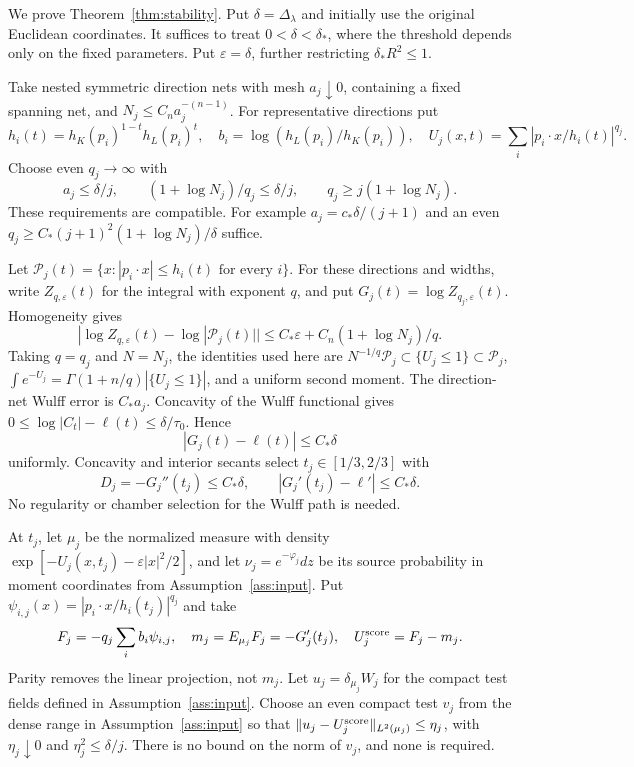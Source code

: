 \documentclass[11pt,reqno]{amsart}
\numberwithin{equation}{section}
\theoremstyle{remark}
\theoremstyle{definition}
\begin{document}
We prove Theorem~\ref{thm:stability}. Put $\delta=\Delta_\lambda$ and initially use the original Euclidean coordinates. It suffices to treat \(0<\delta<\delta_*\), where the threshold depends only on the fixed parameters. Put \(\varepsilon=\delta\), further restricting \(\delta_*R^2\le1\).

Take nested symmetric direction nets with mesh \(a_j\downarrow0\), containing a fixed spanning net, and \(N_j\le C_na_j^{-(n-1)}\). For representative directions put
\[
h_i(t)=h_K(p_i)^{1-t}h_L(p_i)^t,\quad
b_i=\log(h_L(p_i)/h_K(p_i)),\quad
U_j(x,t)=\sum_i|p_i\cdot x/h_i(t)|^{q_j}.
\]
Choose even \(q_j\to\infty\) with
\[
a_j\le\delta/j,\qquad
(1+\log N_j)/q_j\le\delta/j,\qquad
q_j\ge j(1+\log N_j).
                                                                    \tag{3.1}
\]
These requirements are compatible. For example \(a_j=c_*\delta/(j+1)\) and an even \(q_j\ge C_*(j+1)^2(1+\log N_j)/\delta\) suffice. 

Let $\mathcal P_j(t)=\{x:|p_i\cdot x|\le h_i(t)\text{ for every }i\}$.
For these directions and widths, write $Z_{q,\varepsilon}(t)$ for the
integral with exponent $q$, and put
$G_j(t)=\log Z_{q_j,\varepsilon}(t)$.
Homogeneity gives
\[
|\log Z_{q,\varepsilon}(t)-\log|\mathcal P_j(t)||\le
C_*\varepsilon+C_n(1+\log N_j)/q.
\]
Taking $q=q_j$ and $N=N_j$, the identities used here are \(N^{-1/q}\mathcal P_j\subset\{U_j\le1\}\subset\mathcal P_j\),
\(\int e^{-U_j}=\Gamma(1+n/q)|\{U_j\le1\}|\), and a uniform second moment. The direction-net Wulff error is \(C_*a_j\). Concavity of the Wulff functional gives \(0\le\log|C_t|-\ell(t)\le\delta/\tau_0\). Hence
\[
|G_j(t)-\ell(t)|\le C_*\delta
\]
uniformly. Concavity and interior secants select \(t_j\in[1/3,2/3]\) with
\[
D_j=-G_j''(t_j)\le C_*\delta,\qquad
|G_j'(t_j)-\ell'|\le C_*\delta.                       \tag{3.2}
\]
No regularity or chamber selection for the Wulff path is needed.

At $t_j$, let $\mu_j$ be the normalized measure with density
$\exp[-U_j(x,t_j)-\varepsilon|x|^2/2]$, and let
$\nu_j=e^{-\varphi_j}dz$ be its source probability in moment coordinates
from Assumption~\ref{ass:input}. Put
$\psi_{i,j}(x)=|p_i\cdot x/h_i(t_j)|^{q_j}$ and take
\[
F_j=-q_j\sum_i b_i\psi_{i,j},\quad m_j=E_{\mu_j}F_j=-G_j'(t_j),
\quad U_j^{\rm score}=F_j-m_j.
\]
Parity removes the linear projection, not \(m_j\). Let $u_j=\delta_{\mu_j}W_j$ for the compact test fields defined in Assumption~\ref{ass:input}. Choose an even compact test \(v_j\) from the dense range in Assumption~\ref{ass:input} so that
\(\|u_j-U_j^{\rm score}\|_{L^2(\mu_j)}\le\eta_j\), with \(\eta_j\downarrow0\) and \(\eta_j^2\le\delta/j\).
There is no bound on the norm of \(v_j\), and none is required.
\end{document}
